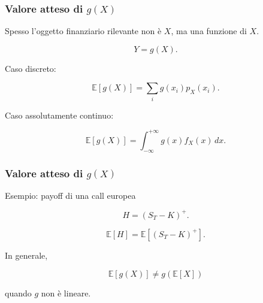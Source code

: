 \documentclass[handout]{beamer}%
\providecommand{\E}{\mathbb{E}}
\providecommand{\1}{\mathbf{1}}
\providecommand{\QTR}[2]{\csname #1\endcsname{#2}}
\begin{document}
\begin{frame}%
%

\frametitle{Valore atteso di $g(X)$}%


Spesso l'oggetto finanziario rilevante non \`{e} $X$, ma una funzione di $X$.%

\[
Y=g(X).
\]


\medskip

Caso discreto:%

\[
\E[g(X)] = \sum_{i} g(x_{i})p_{X}(x_{i}).
\]


\medskip

Caso assolutamente continuo:%

\[
\E[g(X)] = \int_{-\infty}^{+\infty} g(x)f_{X}(x)\,dx.
\]
%

\transboxout
\end{frame}%


%

\begin{frame}%
%

\frametitle{Valore atteso di $g(X)$}%


Esempio: payoff di una call europea%

\[
H=(S_{T}-K)^{+}.
\]
%

\[
\E[H] = \E[(S_T-K)^+].
\]


\medskip

In generale,%

\[
\E[g(X)]\neq g(\E[X])
\]


quando $g$ non \`{e} lineare.%

\transboxout
\end{frame}%


\end{document}
